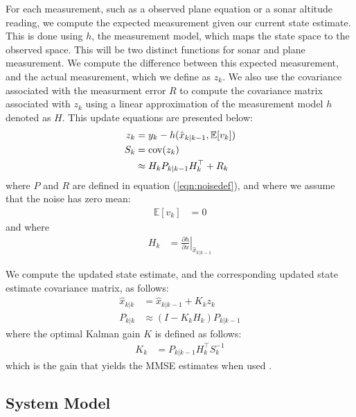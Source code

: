 \documentclass[]{article}
\begin{document}
{For each measurement, such as a observed plane equation or a sonar altitude reading, we compute the expected measurement given our current state estimate. This is done using $h$, the measurement model, which maps the state space to the observed space.
This will be two distinct functions for sonar and plane measurement.
We compute the difference between this expected measurement, and the actual measurement, which we define as $z_k$. We also use the covariance associated with the measurment error $R$ to compute the covariance matrix associated with $z_k$ using a linear approximation of the measurement model $h$ denoted as $H$. This update equations are presented below:
\begin{align}
	\label{eqn:measurement_model}
	z_k &= y_k - h(\hat{x}_{k|k-1}, \mathbb{E}[v_k]) \\
	S_k &= \operatorname{cov}(z_k) \notag \\
		&\approx H_k P_{k|k-1} H_k^\top + R_k
\end{align}
where $P$ and $R$ are defined in equation (\ref{eqn:noisedef}), and where we assume that the noise has zero mean:
\begin{align}
	\mathbb{E}[v_k] &= 0
\end{align}
and where
\begin{align}
	H_{k} &= \left . \frac{\partial h}{\partial x} \right \vert _{\hat{x}_{k|k-1}}
\end{align}

We compute the updated state estimate, and the corresponding updated state estimate covariance matrix, as follows:
\begin{align}
	\hat{x}_{k|k} 	&= \hat{x}_{k|k-1} + K_k z_k \\
	P_{k|k} 		&\approx (I - K_k H_k) P_{k|k-1}
\end{align}
where the optimal Kalman gain $K$ is defined as follows:
\begin{align}
	K_k &= P_{k|k-1} H_k^\top S_k^{-1}
\end{align}
which is the gain that yields the MMSE estimates when used \cite{BerkelyCourse}.


\subsection{System Model} %
\label{sub:system_model}

}
\end{document}
